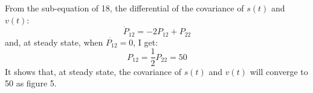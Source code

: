 \documentclass{article}
\begin{document}
\noindent From the sub-equation of 18, the differential of the covariance of $s(t)$ and $v(t)$:
\begin{equation}
	\dot P_{12}  =  - 2P_{12}  + P_{22} 
\end{equation}
and, at steady state, when $\dot{P_{12}}=0$, I get:
\begin{equation}
	P_{12}  = \frac{1}{2}P_{22}  = 50
\end{equation}
It shows that, at steady state, the covariance of $s(t)$ and $v(t)$ will converge to 50 as figure 5.
\end{document}
